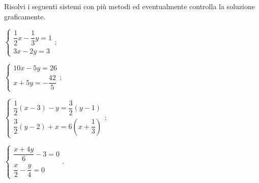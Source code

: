 \begin{esercizio}[\Ast]
\label{ese:22.74}
Risolvi i seguenti sistemi con più metodi ed eventualmente controlla
la soluzione graficamente.
\begin{multicols}{2}
\begin{enumeratea}
 {\longarray
\item $\left\{\begin{array}{l}{\dfrac{1}{2}x-\dfrac{1}{3}y=1}\\{3x-2y=3}\end{array}\right.;$
\item $\left\{\begin{array}{l}{10x-5y=26}\\{x+5y=-\dfrac{42}{5}}\end{array}\right.;$
\item $\left\{\begin{array}{l}\dfrac{1}{2}(x-3)-y=\dfrac{3}{2}(y-1)\\\dfrac{3}{2}(y-2)+x=6\left(x+\dfrac{1}{3}\right)\end{array}\right.;$
\item $\left\{\begin{array}{l}\dfrac{x+4y}{6}-3=0\\\dfrac{x}{2}-\dfrac{y}{4}=0\end{array}\right..$}
\end{enumeratea}
\end{multicols}
\end{esercizio}

